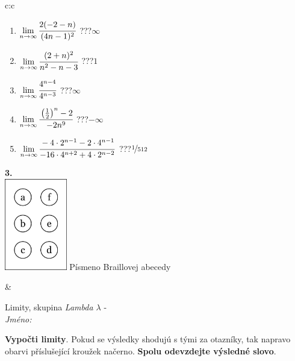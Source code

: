 \documentclass[10pt]{report}
\begin{document}
\begin{tabular}{c:c}
\begin{minipage}[c][104.5mm][t]{0.5\linewidth}
\begin{center}
\begin{minipage}{0.79\linewidth}
\begin{center}
\begin{varwidth}{\linewidth}
\begin{enumerate}
\item $\lim\limits_{n\to\infty}\cfrac{2(-2-n)}{(4n-1)^2}$\quad \dotfill\; ???\;\dotfill \quad $\infty$
\item $\lim\limits_{n\to\infty}\cfrac{(2+n)^2}{n^2-n-3}$\quad \dotfill\; ???\;\dotfill \quad $1$
\item $\lim\limits_{n\to\infty}\cfrac{4^{n-4}}{4^{n-3}}$\quad \dotfill\; ???\;\dotfill \quad $\infty$
\item $\lim\limits_{n\to\infty}\cfrac{\left(\frac{1}{2}\right)^n -2}{-2n^{9}}$\quad \dotfill\; ???\;\dotfill \quad $-\infty$
\item $\lim\limits_{n\to\infty}\cfrac{-4\cdot 2^{n-1}-2\cdot 4^{n-1}}{-16\cdot 4^{n+2}+4\cdot 2^{n-2}}$\quad \dotfill\; ???\;\dotfill \quad $\nicefrac{1}{512}$
\end{enumerate}
\end{varwidth}
\end{center}
\end{minipage}
\begin{minipage}{0.20\linewidth}
\begin{center}
{\Huge\bfseries 3.} \\[2mm]
\includegraphics[height=40mm]{../images/braille.png}
{\small Písmeno Braillovej abecedy}
\end{center}
\end{minipage}
\end{center}
\end{minipage}
&
\begin{minipage}[c][104.5mm][t]{0.5\linewidth}
\begin{center}
\vspace{7mm}
{\huge Limity, skupina \textit{Lambda $\lambda$} -}\\[5mm]
\textit{Jméno:}\phantom{xxxxxxxxxxxxxxxxxxxxxxxxxxxxxxxxxxxxxxxxxxxxxxxxxxxxxxxxxxxxxxxxx}\\[5mm]
\begin{minipage}{0.95\linewidth}
\begin{center}
\textbf{Vypočti limity}. Pokud se výsledky shodujú s tými za otazníky, tak napravo\\obarvi příslušející kroužek načerno. \textbf{Spolu odevzdejte výsledné slovo}.

\end{center}
\end{minipage}
\end{center}
\end{minipage}
\end{tabular}
\end{document}
